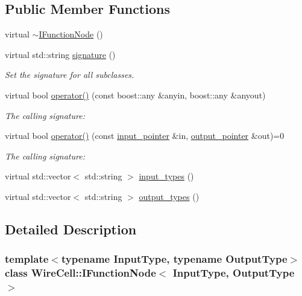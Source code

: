 \subsection*{Public Member Functions}
\begin{DoxyCompactItemize}
\item 
virtual \hyperlink{class_wire_cell_1_1_i_function_node_aa554f458966305cfcbecfd122e892847}{$\sim$\+I\+Function\+Node} ()
\item 
virtual std\+::string \hyperlink{class_wire_cell_1_1_i_function_node_af59f46cf19ca9fdf4aade1f289feedf2}{signature} ()
\begin{DoxyCompactList}\small\item\em Set the signature for all subclasses. \end{DoxyCompactList}\item 
virtual bool \hyperlink{class_wire_cell_1_1_i_function_node_a93547dd6b1a2a44dfc9d5fb458d2ef04}{operator()} (const boost\+::any \&anyin, boost\+::any \&anyout)
\begin{DoxyCompactList}\small\item\em The calling signature\+: \end{DoxyCompactList}\item 
virtual bool \hyperlink{class_wire_cell_1_1_i_function_node_ab17a0438f6545e43efecd7b34e539e5a}{operator()} (const \hyperlink{class_wire_cell_1_1_i_function_node_a55c0946156df9b712b8ad1a0b59b2db6}{input\+\_\+pointer} \&in, \hyperlink{class_wire_cell_1_1_i_function_node_afc02f1ec60d31aacddf64963f9ca650b}{output\+\_\+pointer} \&out)=0
\begin{DoxyCompactList}\small\item\em The calling signature\+: \end{DoxyCompactList}\item 
virtual std\+::vector$<$ std\+::string $>$ \hyperlink{class_wire_cell_1_1_i_function_node_a19aa126e6b3924b2dbc23625e8ff4a8b}{input\+\_\+types} ()
\item 
virtual std\+::vector$<$ std\+::string $>$ \hyperlink{class_wire_cell_1_1_i_function_node_aaabdb086807eaa14b9a5d7f00ee290de}{output\+\_\+types} ()
\end{DoxyCompactItemize}


\subsection{Detailed Description}
\subsubsection*{template$<$typename Input\+Type, typename Output\+Type$>$\newline
class Wire\+Cell\+::\+I\+Function\+Node$<$ Input\+Type, Output\+Type $>$}



